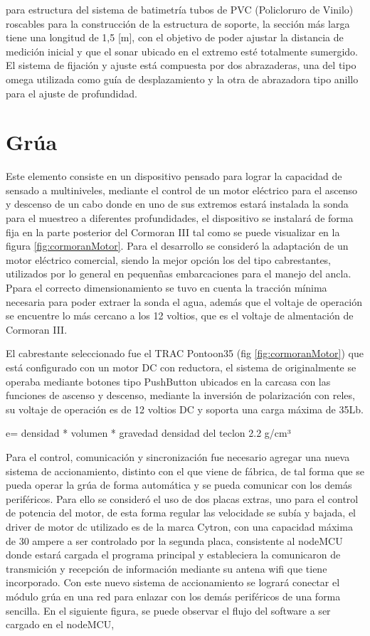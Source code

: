 para estructura del sistema de batimetr\'ia tubos de PVC (Policloruro de Vinilo) roscables para la construcci\'on de la estructura de soporte, la secci\'on m\'as larga tiene una longitud de 1,5 [m], con el objetivo de poder ajustar la distancia de medici\'on inicial y que el sonar ubicado en el extremo est\'e totalmente sumergido. El sistema de fijaci\'on y ajuste est\'a compuesta por dos abrazaderas, una del tipo omega utilizada como gu\'ia de desplazamiento y la otra de abrazadora tipo anillo para el ajuste de profundidad. 

\section{Gr\'ua}
Este elemento consiste en un dispositivo pensado para lograr la capacidad de sensado a multiniveles, mediante el control de un motor el\'ectrico para el ascenso y descenso de un cabo donde en uno de sus extremos estar\'a instalada la sonda para el  muestreo a diferentes profundidades, el dispositivo se instalar\'a de forma fija en la parte posterior del Cormoran III tal como se puede visualizar en la figura \ref{fig:cormoranMotor}.
Para el desarrollo se consider\'o la adaptaci\'on de un motor el\'ectrico comercial, siendo la mejor opci\'on los del tipo cabrestantes, utilizados por lo general en pequen\~nas embarcaciones para el manejo del ancla. Ppara el correcto dimensionamiento se tuvo en cuenta la tracci\'on m\'inima necesaria para poder extraer la sonda el agua, adem\'as que el voltaje de operaci\'on se encuentre lo m\'as cercano a los 12 voltios, que es el voltaje de almentaci\'on de Cormoran III.

El cabrestante seleccionado fue el TRAC Pontoon35 (fig \ref{fig:cormoranMotor}) que est\'a configurado con un motor DC con reductora, el sistema de originalmente se operaba mediante botones tipo PushButton ubicados en la carcasa con las funciones de ascenso y descenso, mediante la inversi\'on de polarizaci\'on con reles, su voltaje de operaci\'on es de 12 voltios DC y soporta una carga m\'axima de 35Lb.

e= densidad * volumen * gravedad 
densidad del teclon 2.2 g/cm³

Para el control, comunicaci\'on y sincronización fue necesario agregar una nueva sistema de accionamiento, distinto con el que viene de fábrica, de tal forma que se pueda operar la gr\'ua de forma autom\'atica y se pueda comunicar con los dem\'as perif\'ericos. Para ello se consideró el uso de dos placas extras, uno para el control de potencia del motor, de esta forma regular las velocidade se subía y bajada, el driver de motor dc utilizado es de la marca Cytron, con una capacidad m\'axima de 30 ampere a ser controlado por la segunda placa, consistente al nodeMCU donde estar\'a cargada el programa principal y estableciera la comunicaron de transmici\'on y recepción de información mediante su antena wifi que tiene incorporado. 
Con este nuevo sistema de accionamiento se logrará conectar el módulo gr\'ua en una red para enlazar con los dem\'as perif\'ericos de una forma sencilla.
En el siguiente figura, se puede observar el flujo del software a ser cargado en el nodeMCU,

